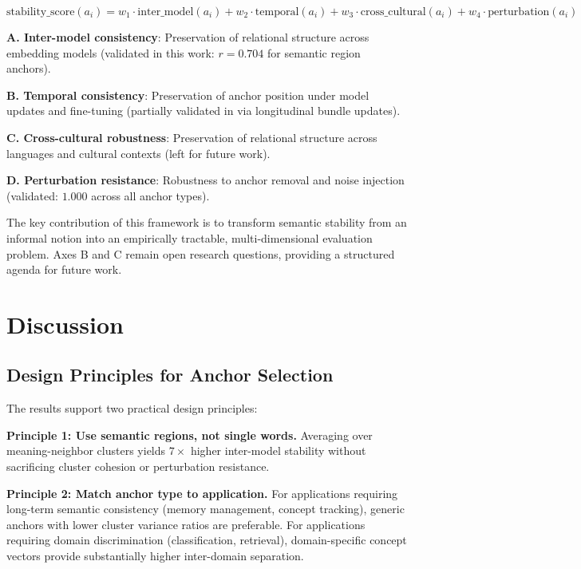 \documentclass[11pt,a4paper]{article}
\begin{document}
\begin{equation}
\text{stability\_score}(a_i) =
  w_1 \cdot \text{inter\_model}(a_i) +
  w_2 \cdot \text{temporal}(a_i) +
  w_3 \cdot \text{cross\_cultural}(a_i) +
  w_4 \cdot \text{perturbation}(a_i)
\label{eq:stability}
\end{equation}

\textbf{A. Inter-model consistency}: Preservation of relational structure
across embedding models (validated in this work: $r = 0.704$ for semantic
region anchors).

\textbf{B. Temporal consistency}: Preservation of anchor position under
model updates and fine-tuning (partially validated in \cite{saitou2026poc}
via longitudinal bundle updates).

\textbf{C. Cross-cultural robustness}: Preservation of relational structure
across languages and cultural contexts (left for future work).

\textbf{D. Perturbation resistance}: Robustness to anchor removal and noise
injection (validated: $1.000$ across all anchor types).

The key contribution of this framework is to transform semantic stability
from an informal notion into an empirically tractable, multi-dimensional
evaluation problem. Axes B and C remain open research questions, providing
a structured agenda for future work.

\section{Discussion}
\label{sec:discussion}

\subsection{Design Principles for Anchor Selection}

The results support two practical design principles:

\textbf{Principle 1: Use semantic regions, not single words.}
Averaging over meaning-neighbor clusters yields $7\times$ higher
inter-model stability without sacrificing cluster cohesion or
perturbation resistance.

\textbf{Principle 2: Match anchor type to application.}
For applications requiring long-term semantic consistency (memory
management, concept tracking), generic anchors with lower cluster
variance ratios are preferable. For applications requiring domain
discrimination (classification, retrieval), domain-specific concept
vectors provide substantially higher inter-domain separation.
\end{document}
